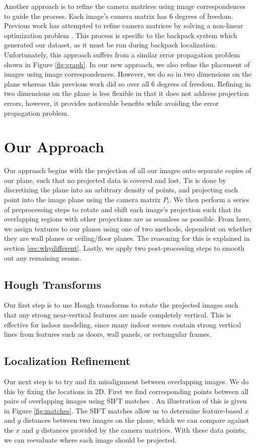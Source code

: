 \documentclass[10pt,twocolumn,letterpaper]{article}
\begin{document}
Another approach is to refine the camera matrices using image
correspondences to guide the process. Each image's camera matrix has 6
degrees of freedom. Previous work has attempted to refine camera
matrices by solving a non-linear optimization problem
\cite{liu2010indoor}. This process is specific to the backpack system
which generated our dataset, as it must be run during backpack
localization\cite{liu2010indoor,chen2010indoor}. Unfortunately, this
approach suffers from a similar error propagation problem shown in
Figure \ref{fig:graph}. In our new approach, we also refine the
placement of images using image correspondences. However, we do so in
two dimensions on the plane whereas this previous work did so over all
6 degrees of freedom. Refining in two dimensions on the plane is less
flexible in that it does not address projection errors, however, it
provides noticeable benefits while avoiding the error propagation
problem.


\section{Our Approach}
Our approach begins 
with the projection of all our images onto
separate copies of our plane, such that no projected data is covered
and lost. Tis is done by discretizing the plane into an arbitrary density of points, and projecting each point into the image plane using the camera matrix $P_i$. We then perform a series of preprocessing steps to rotate
and shift each image's projection such that its overlapping regions
with other projections are as seamless as possible. From here, we assign textures to our planes
using one of two methods, dependent on whether they are wall planes or
ceiling/floor planes. The reasoning for this is explained in section
\ref{sec:whydifferent}. Lastly, we apply two post-processing steps to smooth out
any remaining seams.

\subsection{Hough Transforms}
Our first step is to use Hough transforms to rotate
the projected images such that any strong near-vertical features are made completely vertical. This is effective for indoor modeling, since many indoor
scenes contain strong vertical lines from features such as doors, wall
panels, or rectangular frames.


\subsection{Localization Refinement}
Our next step is to try and fix misalignment between overlapping images.
We do this by fixing
the locations in 2D. First we find corresponding points between all
pairs of overlapping images using SIFT matches
\cite{lowe1999object}. An illustration of this is given in Figure
\ref{fig:matches}. The SIFT matches allow us to determine feature-based $x$ and $y$ distances between two images on the plane, which we can compare against the $x$ and $y$ distances provided by the camera matrices. With these data points, we can reevaluate where each image should be projected.
\end{document}
